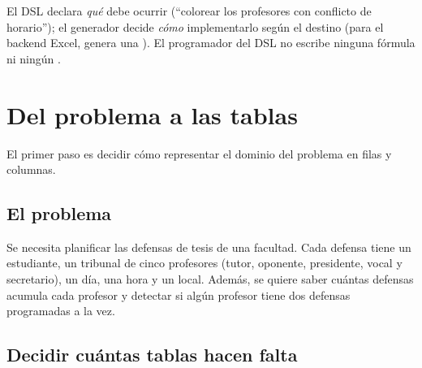 \documentclass[12pt,a4paper]{report}
\begin{document}
El DSL declara \emph{qué} debe ocurrir (``colorear los profesores con
conflicto de horario''); el generador decide \emph{cómo} implementarlo
según el destino (para el backend Excel, genera una  ).  El programador
del DSL no escribe ninguna fórmula ni ningún .


\section{Del problema a las tablas}
\label{sec:modelado}

El primer paso es decidir cómo representar el dominio del problema en filas
y columnas. 

\subsection{El problema}



Se necesita planificar las defensas de tesis de una facultad.  Cada defensa
tiene un estudiante, un tribunal de cinco profesores (tutor, oponente,
presidente, vocal y secretario), un día, una hora y un local.  Además, se
quiere saber cuántas defensas acumula cada profesor y detectar si algún
profesor tiene dos defensas programadas a la vez.


\subsection{Decidir cuántas tablas hacen falta}
\end{document}
